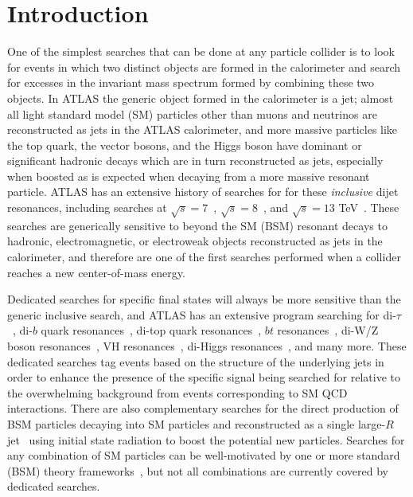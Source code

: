 \section{Introduction}
\label{sec:CWoLa:intro}
One of the simplest searches that can be done at any particle collider is to look for events in which two distinct objects are formed in the calorimeter and search for excesses in the invariant mass spectrum formed by combining these two objects.
In ATLAS the generic object formed in the calorimeter is a jet; almost all light standard model (SM) particles other than muons and neutrinos are reconstructed as jets in the ATLAS calorimeter, and more massive particles like the top quark, the vector bosons, and the Higgs boson have dominant or significant hadronic decays which are in turn reconstructed as jets, especially when boosted as is expected when decaying from a more massive resonant particle.
ATLAS has an extensive history of searches for for these \textit{inclusive} dijet resonances, including searches at $\sqrt{s}=7$~\cite{Aad:2010ae,Aad:2011aj,Aad:2011fq}, $\sqrt{s}=8$~\cite{Aad:2014aqa}, and $\sqrt{s}=13$ TeV~\cite{ATLAS:2015nsi,Aaboud:2017yvp,Aaboud:2018fzt,Aad:2019hjw}.
These searches are generically sensitive to beyond the SM (BSM) resonant decays to hadronic, electromagnetic, or electroweak objects reconstructed as jets in the calorimeter, and therefore are one of the first searches performed when a collider reaches a new center-of-mass energy.

Dedicated searches for specific final states will always be more sensitive than the generic inclusive search, and ATLAS has an extensive program searching for di-$\tau$~\cite{Aaboud:2016cre,Aaboud:2017sjh}, di-$b$ quark resonances~\cite{Aaboud:2016nbq,Aaboud:2018tqo}, di-top quark resonances~\cite{Aaboud:2018mjh}, $bt$ resonances~\cite{Aaboud:2018juj}, di-W/Z boson resonances~\cite{Aaboud:2016okv,Aaboud:2017fgj,Aaboud:2017itg,Aaboud:2017eta,Aad:2019fbh}, VH resonances~\cite{Aaboud:2018eoy,Aaboud:2017cxo,Aaboud:2017ahz}, di-Higgs resonances~\cite{Aaboud:2018knk}, and many more.
These dedicated searches tag events based on the structure of the underlying jets in order to enhance the presence of the specific signal being searched for relative to the overwhelming background from events corresponding to SM QCD interactions.
There are also complementary searches for the direct production of BSM particles decaying into SM particles and reconstructed as a single large-$R$ jet~\cite{Aaboud:2018zba,Aaboud:2018fzt,Aaboud:2019zxd} using initial state radiation to boost the potential new particles.
Searches for any combination of SM particles can be well-motivated by one or more standard (BSM) theory frameworks~\cite{Craig:2016rqv,Kim:2019rhy}, but not all combinations are currently covered by dedicated searches.

